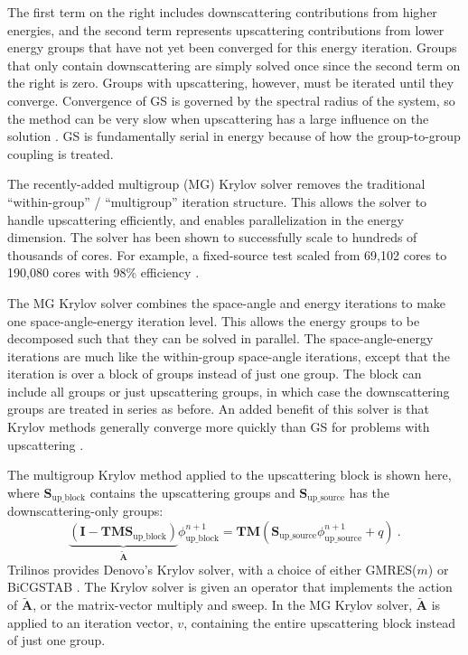 \documentclass[preprint,12pt]{elsarticle}
\newcommand{\ve}[1]{\ensuremath{\mathbf{#1}}}
\begin{document}
The first term on the right includes downscattering contributions from higher energies, and the second term represents upscattering contributions from lower energy groups that have not yet been converged for this energy iteration. Groups that only contain downscattering are simply solved once since the second term on the right is zero. Groups with upscattering, however, must be iterated until they converge. Convergence of GS is governed by the spectral radius of the system, so the method can be very slow when upscattering has a large influence on the solution \cite{Adams2002}. GS is fundamentally serial in energy because of how the group-to-group coupling is treated. 

The recently-added multigroup (MG) Krylov solver removes the traditional ``within-group'' / ``multigroup'' iteration structure. This allows the solver to handle upscattering efficiently, and enables parallelization in the energy dimension. The solver has been shown to successfully scale to hundreds of thousands of cores. For example, a fixed-source test scaled from 69,102 cores to 190,080 cores with 98\% efficiency \cite{Slaybaugh2011}. 

The MG Krylov solver combines the space-angle and energy iterations to make one space-angle-energy iteration level. This allows the energy groups to be decomposed such that they can be solved in parallel. The space-angle-energy iterations are much like the within-group space-angle iterations, except that the iteration is over a block of groups instead of just one group. The block can include all groups or just upscattering groups, in which case the downscattering groups are treated in series as before. An added benefit of this solver is that Krylov methods generally converge more quickly than GS for problems with upscattering \cite{Trefethen1997}.

The multigroup Krylov method applied to the upscattering block is shown here, where $\ve{S}_{\text{up\_block}}$ contains the upscattering groups and $\ve{S}_{\text{up\_source}}$ has the downscattering-only groups:
%
\begin{equation}
  \underbrace{(\ve{I} - \ve{TMS}_{\text{up\_block}})}_{\tilde{\ve{A}}}\phi_{\text{up\_block}}^{n+1} = \ve{TM}(\ve{S}_{\text{up\_source}}\phi_{\text{up\_source}}^{n+1} + q) \:.
  \label{eq:MGkrylov}
\end{equation}
%
Trilinos \cite{1089021} provides Denovo's Krylov solver, with a choice of either GMRES($m$) or BiCGSTAB \cite{Evans2010}. The Krylov solver is given an operator that implements the action of $\ve{\tilde{A}}$, or the matrix-vector multiply and sweep. In the MG Krylov solver, $\ve{\tilde{A}}$ is applied to an iteration vector, $v$, containing the entire upscattering block instead of just one group.%
%
\end{document}
